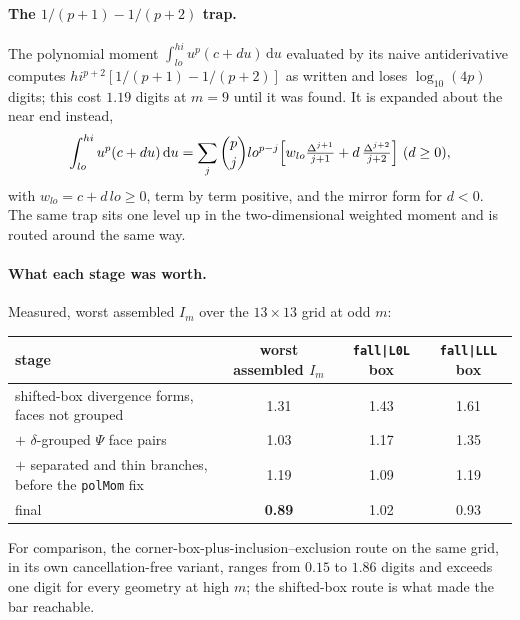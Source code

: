 \documentclass[11pt]{article}
\theoremstyle{remark}
\newcommand{\dd}{\mathrm{d}}
\newcommand{\code}[1]{\texttt{#1}}
\begin{document}
\paragraph{The $1/(p+1) - 1/(p+2)$ trap.} The polynomial moment
$\int_{lo}^{hi}u^p(c+du)\,\dd u$ evaluated by its naive antiderivative computes
$hi^{p+2}[1/(p+1) - 1/(p+2)]$ as written and loses $\log_{10}(4p)$ digits; this cost
$1.19$ digits at $m = 9$ until it was found. It is expanded about the near end instead,
\begin{equation}
\int_{lo}^{hi} u^p(c+du)\,\dd u = \sum_j \binom{p}{j} lo^{p-j}
\Bigl[w_{lo}\tfrac{\Delta^{j+1}}{j+1} + d\,\tfrac{\Delta^{j+2}}{j+2}\Bigr]\ (d\ge0),
\end{equation}
with $w_{lo} = c+d\,lo \ge 0$, term by term positive, and the mirror form for $d<0$. The
same trap sits one level up in the two-dimensional weighted moment and is routed around
the same way.

\paragraph{What each stage was worth.} Measured, worst assembled $I_m$ over the
$13\times13$ grid at odd $m$:

\begin{center}\footnotesize
\begin{tabular}{@{}lccc@{}}
\toprule
stage & worst assembled $I_m$ & \code{fall|L0L} box & \code{fall|LLL} box\\
\midrule
shifted-box divergence forms, faces not grouped & 1.31 & 1.43 & 1.61\\
$+$ $\delta$-grouped $\Psi$ face pairs & 1.03 & 1.17 & 1.35\\
$+$ separated and thin branches, before the \code{polMom} fix & 1.19 & 1.09 & 1.19\\
final & \textbf{0.89} & 1.02 & 0.93\\
\bottomrule
\end{tabular}
\end{center}
\noindent
For comparison, the corner-box-plus-inclusion--exclusion route on the same grid, in its own
cancellation-free variant, ranges from $0.15$ to $1.86$ digits and exceeds one digit for
every geometry at high $m$; the shifted-box route is what made the bar reachable.
\end{document}
